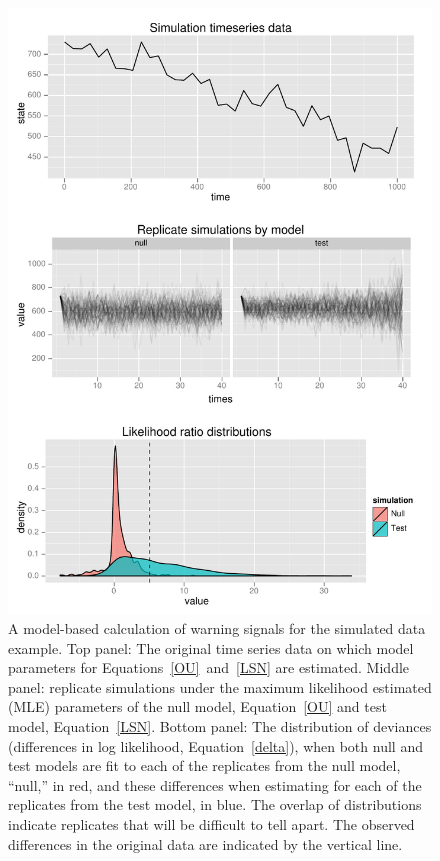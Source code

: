 \documentclass[authoryear,review,11pt]{elsarticle}
\begin{document}

 \begin{figure}
   \begin{center}
     \includegraphics[width=.73\linewidth]{figures/Simulation_warningsignal.pdf}
     \caption{A model-based calculation of warning signals for the simulated data example.  Top panel: The original time series data on which model parameters for Equations~\eqref{OU}~and~\eqref{LSN} are estimated. Middle panel: replicate simulations under the maximum likelihood estimated (MLE) parameters of the null model, Equation~\eqref{OU} and test model, Equation~\eqref{LSN}.  Bottom panel: The distribution of deviances (differences in log likelihood, Equation~\eqref{delta}), when both null and test models are fit to each of the replicates from the null model, ``null,'' in red, and these differences when estimating for each of the replicates from the test model, in blue.  The overlap of distributions indicate replicates that will be difficult to tell apart.  The observed differences in the original data are indicated by the vertical line.}
     \label{fig:simulation}
  \end{center}
 \end{figure}
\end{document}
